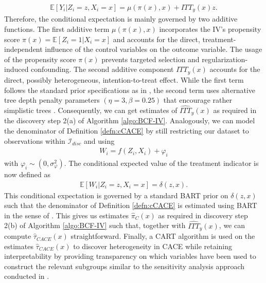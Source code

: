 \begin{align*}
    \mathbb{E}\left[Y_i | Z_i = z, X_i=x \right] = \mu\left(\pi(x), x\right) + ITT_y(x)z. 
\end{align*}
Therefore, the conditional expectation is mainly governed by two additive functions. 
The first additive term $\mu\left(\pi(x), x\right)$ incorporates the IV's propensity score $\pi(x)=\mathbb{E}[Z_i=1 | X_i=x]$ and accounts for the direct, treatment-independent influence of the control variables on the outcome variable. 
The usage of the propensity score $\pi(x)$ prevents targeted selection and regularization-induced confounding. 
The second additive component $ITT_y(x)$ accounts for the direct, possibly heterogeneous, intention-to-treat effect. 
While the first term follows the standard prior specifications as in \cite{chipman_bart_2010}, the second term uses alternative tree depth penalty parameters $(\eta = 3, \beta=0.25)$ that encourage rather simplistic trees \cite{hahn_bayesian_2020}.
Consequently, we can get estimates of $\widehat{ITT}_y(x)$ as required in the discovery step 2(a) of Algorithm \ref{algo:BCF-IV}.
Analogously, we can model the denominator of Definition \ref{defn:cCACE} by still restricting our dataset to observations within $\mathcal{I}_{disc}$ and using
\begin{align*}
    W_i = f(Z_i, X_i) + \varphi_i 
\end{align*}
with $\varphi_i \sim \left(0, \sigma_{\varphi}^2\right)$. The conditional expected value of the treatment indicator is now defined as       
\begin{align*}
    \mathbb{E}\left[W_i | Z_i = z, X_i=x \right] = \delta(z, x).
\end{align*}
This conditional expectation is governed by a standard BART prior on $\delta(z, x)$ such that the denominator of Definition \ref{defn:cCACE} is estimated using BART in the sense of \cite{Hill_2011}. This gives us estimates $\widehat{\pi}_{C}(x)$ as required in discovery step 2(b) of Algorithm \ref{algo:BCF-IV} such that, together with $\widehat{ITT}_y(x)$, we can compute $\widehat\tau_{CACE}(x)$ straightforward.
Finally, a CART algorithm is used on the estimates $\widehat\tau_{CACE}(x)$ to discover heterogeneity in CACE while retaining interpretability by providing transparency on which variables have been used to construct the relevant subgroups similar to the sensitivity analysis approach conducted in \cite{hahn_bayesian_2020}. 

